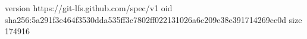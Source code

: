 version https://git-lfs.github.com/spec/v1
oid sha256:5a291f3e464f3530dda535ff3c7802ff022131026a6c209e38e391714269ce0d
size 174916
